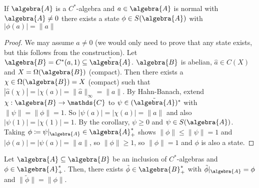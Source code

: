 \documentclass[a4paper]{article}
\begin{document}
\begin{theorem}
	If $\algebra{A}$ is a $C^*$-algebra and $a \in \algebra{A}$ is normal with $\algebra{A} \neq 0$ there exists a state $\phi \in S(\algebra{A})$ with $|\phi(a)| = \|a\|$ 
\end{theorem}

\begin{proof}
	We may assume $a \neq 0$ (we would only need to prove that any state exists, but this follows from the construction).
	Let $\algebra{B} = C^*(a, 1) \subseteq \tilde{\algebra{A}}$.
	$\algebra{B}$ is abelian, $\hat{a} \in C(X)$ and $X = \Omega(\algebra{B})$ (compact).
	Then there exists a $\chi \in \Omega(\algebra{B}) = X$ (compact) such that $| \hat{a}(\chi)| = |\chi(a)| = \|\hat{a}\|_\infty = \|a\|$.
	By Hahn-Banach, extend $\chi: \algebra{B} \to \mathds{C}$ to $\psi \in (\tilde{\algebra{A}})^*$ with $\|\psi\| = \|\phi\| = 1$.
	So $|\psi(a)| = |\chi(a)| = \|a\|$ and also $|\psi(1)| = |\chi(1)| = 1$.
	By the corollary, $\psi \geq 0$ and $\psi \in S(\algebra{A})$.
	Taking $\phi \coloneq \psi|_\algebra{A} \in \algebra{A}_+^*$ shows $\|\phi\| \leq \|\psi\| = 1$ and $|\phi(a)| = |\psi(a)| = \|a\|$, so $\|\phi\| \geq 1$, so $\|\phi\| = 1$ and $\phi$ is also a state.
\end{proof}

\begin{theorem}
	Let $\algebra{A} \subseteq \algebra{B}$ be an inclusion of $C^*$-algebras and $\phi \in \algebra{A}_+^*$. Then, there exists $\tilde{\phi} \in \algebra{B}_+^*$ with $\tilde{\phi}|_\algebra{A} = \phi$ and $\|\tilde{\phi}\| = \|\phi\|$.
\end{theorem} 
\end{document}
